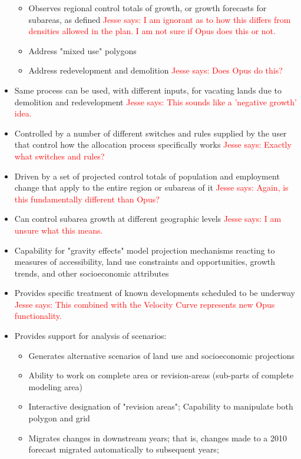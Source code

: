 \documentclass[titlepage]{article}
\begin{document}
\begin{itemize}
\begin{itemize}
			\item Observes regional control totals of growth, or growth forecasts for subareas, as defined
				\textcolor{red}{Jesse says: I am ignorant as to how this differs from densities allowed in the plan.  I am not sure if Opus does this or not.}
			\item Address "mixed use" polygons
			\item Address redevelopment and demolition
				\textcolor{red}{Jesse says: Does Opus do this?}
		\end{itemize}
	\item Same process can be used, with different inputs, for vacating lands due to demolition and redevelopment
		\textcolor{red}{Jesse says: This sounds like a 'negative growth' idea.}
	\item Controlled by a number of different switches and rules supplied by the user that control how the allocation process specifically works
		\textcolor{red}{Jesse says: Exactly what switches and rules?}
	\item Driven by a set of projected control totals of population and employment change that apply to the entire region or subareas of it
		\textcolor{red}{Jesse says: Again, is this fundamentally different than Opus?}
	\item Can control subarea growth at different geographic levels
		\textcolor{red}{Jesse says: I am unsure what this means.}
	\item Capability for  "gravity effects" model projection mechanisms reacting to measures of accessibility, land use constraints and opportunities, growth trends, and other socioeconomic attributes
	\item Provides specific treatment of known developments scheduled to be underway
		\textcolor{red}{Jesse says: This combined with the Velocity Curve represents new Opus functionality.}
	\item Provides support for analysis of scenarios:
		\begin{itemize}
			\item Generates alternative scenarios of land use and socioeconomic projections
			\item Ability to work on complete area or revision-areas (sub-parts of complete modeling area)
			\item Interactive designation of  "revision areas"; Capability to manipulate both polygon and grid
			\item Migrates changes in downstream years; that is, changes made to a 2010 forecast migrated automatically to subsequent years;

\end{itemize}
\end{itemize}
\end{document}
